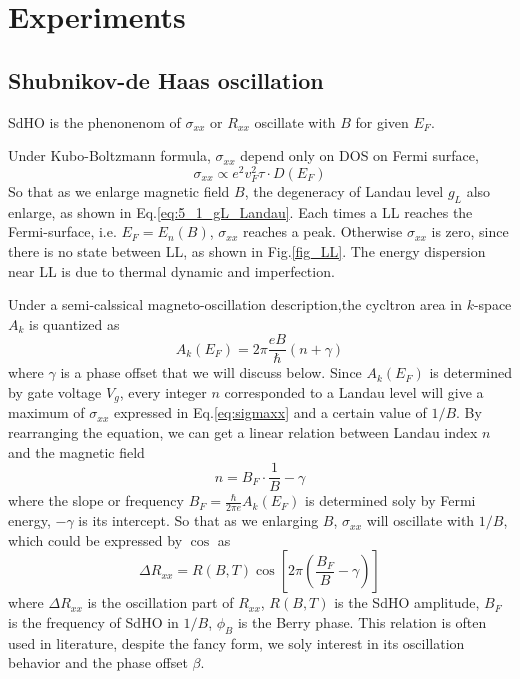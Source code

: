 \documentclass[12pt,a4paper]{article}
\begin{document}
\section{Experiments}

\subsection{Shubnikov-de Haas oscillation}

    SdHO is the phenonenom of $\sigma_{xx}$ or $R_{xx}$ oscillate with $B$ for given $E_F$.

    Under Kubo-Boltzmann formula, $\sigma_{xx}$ depend only on DOS on Fermi surface,
    \begin{equation}
    \label{eq:sigmaxx}
        \sigma_{xx} \propto e^2 v_F^2 \tau \cdot D(E_F)
    \end{equation}
    So that as we enlarge magnetic field $B$, the degeneracy of Landau level $g_L$ also enlarge, as shown in Eq.\eqref{eq:5_1_gL_Landau}. Each times a LL reaches the Fermi-surface, i.e. $E_F = E_n(B)$, $\sigma_{xx}$ reaches a peak. Otherwise $\sigma_{xx}$ is zero, since there is no state between LL, as shown in Fig.\ref{fig_LL}. The energy dispersion near LL is due to thermal dynamic and imperfection.

    Under a semi-calssical magneto-oscillation description,the cycltron area in $k$-space $A_k$ is quantized as
    \[ A_k(E_F) = 2\pi \frac{eB}{\hbar} (n + \gamma) \]
    where $\gamma$ is a phase offset that we will discuss below. Since $A_k(E_F)$ is determined by gate voltage $V_g$, every integer $n$ corresponded to a Landau level will give a maximum of $\sigma_{xx}$ expressed in Eq.\eqref{eq:sigmaxx} and a certain value of $1/B$. By rearranging the equation, we can get a linear relation between Landau index $n$ and the magnetic field
    \begin{equation}
    \label{eq:BF}
        n = B_F \cdot \frac{1}{B} - \gamma
    \end{equation}
    where the slope or frequency $B_F = \frac{\hbar}{2\pi e} A_k(E_F)$ is determined soly by Fermi energy, $-\gamma$ is its intercept. So that as we enlarging $B$, $\sigma_{xx}$ will oscillate with $1/B$, which could be expressed by $\cos$ as
    \begin{equation}
    \label{eq:DRxx}
        \Delta R_{xx} = R(B, T) \cos\left[2\pi\left(\frac{B_F}{B} -\gamma \right)\right]
    \end{equation}
    where $\Delta R_{xx}$ is the oscillation part of $R_{xx}$, $R(B,T)$ is the SdHO amplitude, $B_F$ is the frequency of SdHO in $1/B$, $\phi_B$ is the Berry phase. This relation is often used in literature, despite the fancy form, we soly interest in its oscillation behavior and the phase offset $\beta$.
\end{document}
